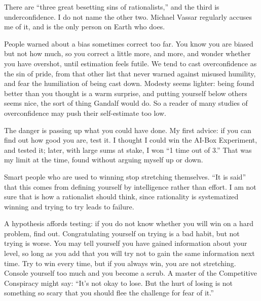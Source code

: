 
There are ``three great besetting sins of rationalists,'' and the third is underconfidence. I do not name the other two. Michael Vassar regularly accuses me of it, and is the only person on Earth who does. 

People warned about a bias sometimes correct too far. You know you are biased but not how much, so you correct a little more, and more, and wonder whether you have overshot, until estimation feels futile.  We tend to cast overconfidence as the sin of pride, from that other list that never warned against misused humility, and fear the humiliation of being cast down. Modesty seems lighter: being found better than you thought is a warm surprise, and putting yourself below others seems nice, the sort of thing Gandalf would do. So a reader of many studies of overconfidence may push their self-estimate too low. 

The danger is passing up what you could have done. My first advice: if you can find out how good you are, test it. I thought I could win the AI-Box Experiment, and tested it; later, with large sums at stake, I won ``1 time out of 3.'' That was my limit at the time, found without arguing myself up or down.

Smart people who are used to winning stop stretching themselves. ``It is said'' that this comes from defining yourself by intelligence rather than effort.  I am not sure that is how a rationalist should think, since rationality is systematized winning and trying to try leads to failure.

A hypothesis affords testing: if you do not know whether you will win on a hard problem, find out. Congratulating yourself on trying is a bad habit, but not trying is worse. You may tell yourself you have gained information about your level, so long as you add that you will try not to gain the same information next time. Try to win every time, but if you always win, you are not stretching. Console yourself too much and you become a scrub. A master of the Competitive Conspiracy might say: ``It's not okay to lose. But the hurt of losing is not something so scary that you should flee the challenge for fear of it.''

